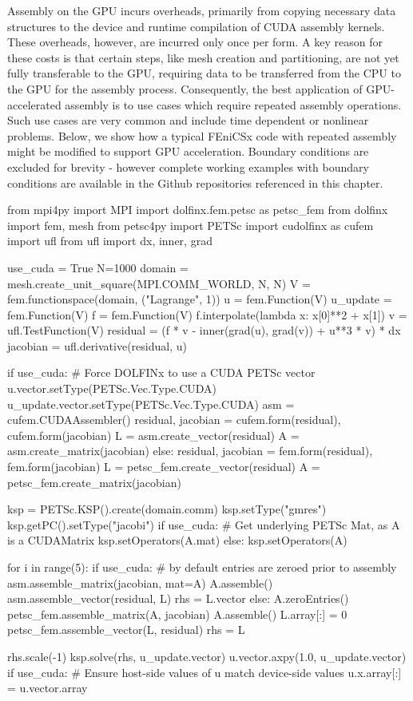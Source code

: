 Assembly on the GPU incurs overheads, primarily from copying necessary data structures to the device and runtime compilation of CUDA assembly kernels. These overheads, however, are incurred only once per form. A key reason for these costs is that certain steps, like mesh creation and partitioning, are not yet fully transferable to the GPU, requiring data to be transferred from the CPU to the GPU for the assembly process. Consequently, the best application of GPU-accelerated assembly is to use cases which require repeated assembly operations. Such use cases are very common and include time dependent or nonlinear problems. Below, we show how a typical FEniCSx code with repeated assembly might be modified to support GPU acceleration. Boundary conditions are excluded for brevity - however complete working examples with boundary conditions are available in the Github repositories referenced in this chapter.

\begin{python}
from mpi4py import MPI
import dolfinx.fem.petsc as petsc_fem
from dolfinx import fem, mesh
from petsc4py import PETSc
import cudolfinx as cufem
import ufl
from ufl import dx, inner, grad

use_cuda = True
N=1000
domain = mesh.create_unit_square(MPI.COMM_WORLD, N, N)
V = fem.functionspace(domain, ("Lagrange", 1))
u = fem.Function(V)
u_update = fem.Function(V)
f = fem.Function(V)
f.interpolate(lambda x: x[0]**2 + x[1])
v = ufl.TestFunction(V)
residual = (f * v - inner(grad(u), grad(v)) + u**3 * v) * dx
jacobian = ufl.derivative(residual, u)

if use_cuda:
  # Force DOLFINx to use a CUDA PETSc vector
  u.vector.setType(PETSc.Vec.Type.CUDA)
  u_update.vector.setType(PETSc.Vec.Type.CUDA)
  asm = cufem.CUDAAssembler()
  residual, jacobian = cufem.form(residual), cufem.form(jacobian)
  L = asm.create_vector(residual)
  A = asm.create_matrix(jacobian)
else:
  residual, jacobian = fem.form(residual), fem.form(jacobian)
  L = petsc_fem.create_vector(residual)
  A = petsc_fem.create_matrix(jacobian)

ksp = PETSc.KSP().create(domain.comm)
ksp.setType("gmres")
ksp.getPC().setType("jacobi")
if use_cuda:
  # Get underlying PETSc Mat, as A is a CUDAMatrix
  ksp.setOperators(A.mat)
else:
  ksp.setOperators(A)

for i in range(5):
  if use_cuda:
    # by default entries are zeroed prior to assembly
    asm.assemble_matrix(jacobian, mat=A)
    A.assemble()
    asm.assemble_vector(residual, L)
    rhs = L.vector
  else:
    A.zeroEntries()
    petsc_fem.assemble_matrix(A, jacobian)
    A.assemble()
    L.array[:] = 0
    petsc_fem.assemble_vector(L, residual)
    rhs = L

  rhs.scale(-1)
  ksp.solve(rhs, u_update.vector)
  u.vector.axpy(1.0, u_update.vector)
  if use_cuda:
    # Ensure host-side values of u match device-side values
    u.x.array[:] = u.vector.array
\end{python}

